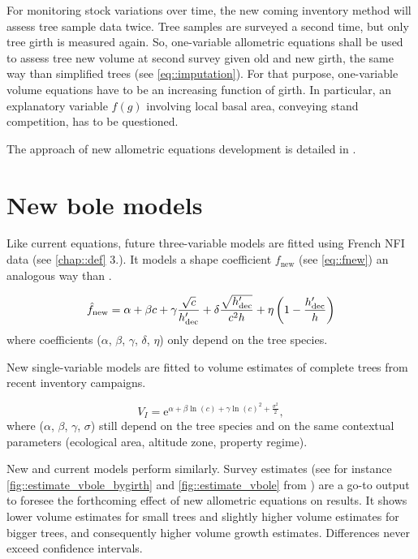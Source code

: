 For monitoring stock variations over time, the new coming inventory method will assess tree sample data twice. Tree samples are surveyed a second time, but only tree girth is measured again. So, one-variable allometric equations shall be used to assess tree new volume at second survey given old and new girth, the same way than simplified trees (see \ref{eq::imputation}). For that purpose, one-variable volume equations have to be an increasing function of girth. In particular, an explanatory variable \( f(g) \) involving local basal area, conveying stand competition, has to be questioned.  

The approach of new allometric equations development is detailed in \cite{Gohon2024}.  

\section{New bole models\label{sec::new_allom}}

Like current equations, future three-variable models are fitted using French NFI data (see \ref{chap::def} 3.). It models a shape coefficient \( f_{\text{new}} \) (see \ref{eq::fnew}) an analogous way than \cite{Morneau2016}.  

\[
	\hat f_{\text{new}} = \alpha + \beta c + \gamma \frac{\sqrt{c}}{h_{\text{dec}}'} + \delta \frac{\sqrt{h_{\text{dec}}'}}{c^2 h} + \eta \left( 1 - \frac{h_{\text{dec}}'}{h} \right)
\]
where coefficients (\( \alpha \), \( \beta \), \( \gamma \), \( \delta \), \( \eta \)) only depend on the tree species.  

New single-variable models are fitted to volume estimates of complete trees from recent inventory campaigns.

\[
	V_{I} = \mathrm{e}^{\alpha + \beta \ln(c) + \gamma \ln(c)^2 + \frac{\sigma^2}{2}},
\]
where (\( \alpha \), \( \beta \), \( \gamma \), \( \sigma \)) still depend on the tree species and on the same contextual parameters (ecological area, altitude zone, property regime).

New and current models perform similarly.
Survey estimates (see for instance \ref{fig::estimate_vbole_bygirth} and \ref{fig::estimate_vbole} from \cite{Gohon2024}) are a go-to output to foresee the forthcoming effect of new allometric equations on \NFI{} results. It shows lower volume estimates for small trees and slightly higher volume estimates for bigger trees, and consequently higher volume growth estimates. Differences never exceed confidence intervals.


